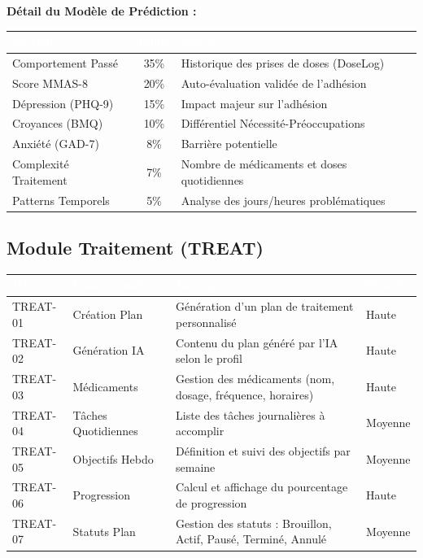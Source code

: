 \documentclass[12pt,a4paper]{report}
\begin{document}
\textbf{Détail du Modèle de Prédiction :} \\

\begin{tabularx}{\textwidth}{|l|c|X|}
    \hline
    \rowcolor{emsiblue}\textcolor{white}{\textbf{Facteur}} & \textcolor{white}{\textbf{Poids}} & \textcolor{white}{\textbf{Source}} \\
    \hline
    Comportement Passé & 35\% & Historique des prises de doses (DoseLog) \\
    \hline
    Score MMAS-8 & 20\% & Auto-évaluation validée de l'adhésion \\
    \hline
    Dépression (PHQ-9) & 15\% & Impact majeur sur l'adhésion \\
    \hline
    Croyances (BMQ) & 10\% & Différentiel Nécessité-Préoccupations \\
    \hline
    Anxiété (GAD-7) & 8\% & Barrière potentielle \\
    \hline
    Complexité Traitement & 7\% & Nombre de médicaments et doses quotidiennes \\
    \hline
    Patterns Temporels & 5\% & Analyse des jours/heures problématiques \\
    \hline
\end{tabularx}

\subsection{Module Traitement (TREAT)}

\begin{longtable}{|p{2cm}|p{4cm}|p{7cm}|p{1.5cm}|}
    \hline
    \rowcolor{emsiblue}\textcolor{white}{\textbf{ID}} & \textcolor{white}{\textbf{Fonctionnalité}} & \textcolor{white}{\textbf{Description}} & \textcolor{white}{\textbf{Priorité}} \\
    \hline
    
    TREAT-01 & Création Plan & Génération d'un plan de traitement personnalisé & Haute \\
    \hline
    TREAT-02 & Génération IA & Contenu du plan généré par l'IA selon le profil & Haute \\
    \hline
    TREAT-03 & Médicaments & Gestion des médicaments (nom, dosage, fréquence, horaires) & Haute \\
    \hline
    TREAT-04 & Tâches Quotidiennes & Liste des tâches journalières à accomplir & Moyenne \\
    \hline
    TREAT-05 & Objectifs Hebdo & Définition et suivi des objectifs par semaine & Moyenne \\
    \hline
    TREAT-06 & Progression & Calcul et affichage du pourcentage de progression & Haute \\
    \hline
    TREAT-07 & Statuts Plan & Gestion des statuts : Brouillon, Actif, Pausé, Terminé, Annulé & Moyenne \\
    \hline
\end{longtable}
\end{document}
